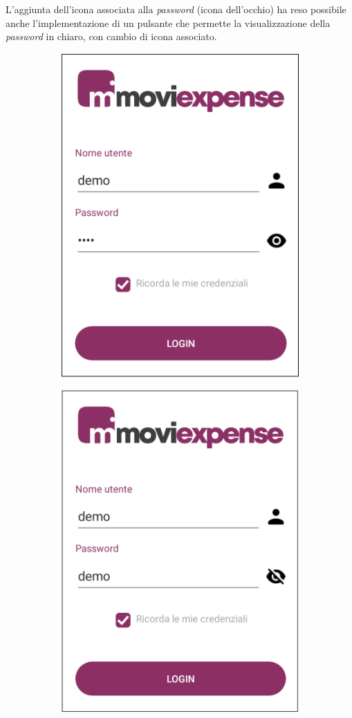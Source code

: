 \noindent L'aggiunta dell'icona associata alla \textit{password} (icona dell'occhio) ha reso possibile anche l'implementazione di un pulsante che permette la visualizzazione della \textit{password} in chiaro, con cambio di icona associato.

\begin{figure}[H]
    \begin{subfigure}{.5\textwidth}
        \centering
        \includegraphics[width=.7\columnwidth]{images/screenshot/new/login.png}\vspace{2mm}
    \end{subfigure}
    \begin{subfigure}{.5\textwidth}
        \centering
        \includegraphics[width=.7\columnwidth]{images/screenshot/new/login2.png}\vspace{2mm}

\end{subfigure}
\end{figure}

